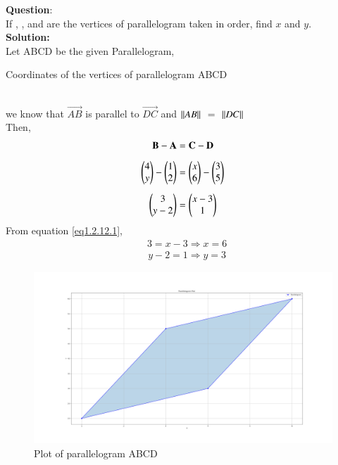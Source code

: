 \documentclass[journal]{IEEEtran}
\begin{document}
\textbf{Question}:\vspace{.5em} \\ If , ,  and  are the vertices of parallelogram taken in order, find $x$ and $y$.\vspace{.5em} \\  \textbf{Solution:} \\ \hspace {0.5em} Let ABCD be the given Parallelogram, \\ 
\begin{table}[h!]
\centering
    \caption{Coordinates of the vertices of parallelogram ABCD}

\end{table}
 \\ we know that $\vec{AB}$ is parallel to $\vec{DC}$ and  $\left\vert\left\vert AB\right\vert\right\vert$ $=$ $\left\vert\left\vert DC\right\vert\right\vert$ \\ Then,
\begin{align}
	\mathbf{B}-\mathbf{A}&=\mathbf{C}-\mathbf{D}\\[.5em]
\begin{pmatrix}4 \\ y\end{pmatrix}-\begin{pmatrix}1 \\ 2\end{pmatrix}&=\begin{pmatrix}x \\ 6\end{pmatrix}-\begin{pmatrix}3 \\ 5\end{pmatrix}\\[0.5em] 
\begin{pmatrix}3 \\ y-2\end{pmatrix}&=\begin{pmatrix}x-3 \\ 1\end{pmatrix}\label{eq1.2.12.1} \end{align}
\hspace{8em} From equation\hspace{0.5em} \eqref{eq1.2.12.1}, \begin{align} &3=x-3	\Rightarrow x=6  \end{align} \begin{align} &y-2=1 \Rightarrow y=3\end{align}
\begin{figure}[h!]
   \centering \includegraphics[width=0.7\linewidth]{figs/Figure_1.png}
   \caption{Plot of parallelogram ABCD}
   \label{Parallelogram}
\end{figure}
\end{document}
